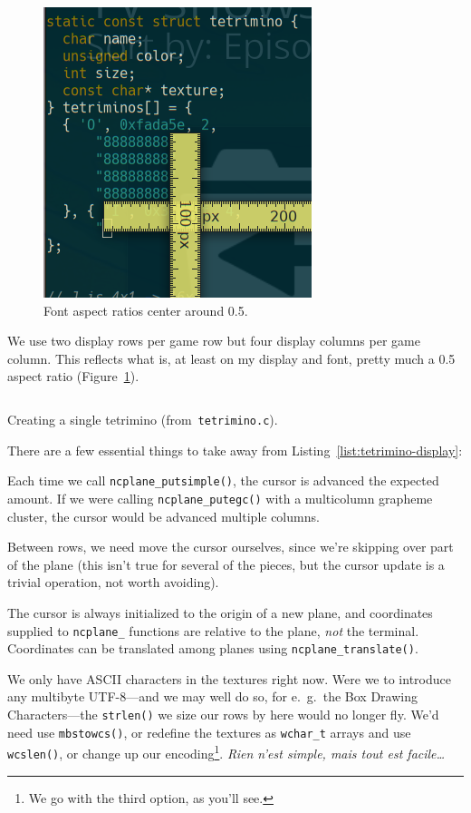 \begin{figure}[!htbp]
\centering \includegraphics[width=.5\linewidth]{media/screenruler.png}
\caption{Font aspect ratios center around 0.5.}
\label{fig:aspectratio}
\end{figure}

We use two display rows per game row but four display columns per game column.
This reflects what is, at least on my display and font, pretty much a 0.5
aspect ratio (Figure~\ref{fig:aspectratio}).

\begin{listing}[!htbp]
\inputminted[]{C}{code/tetrimino-display.h}
\caption{Creating a single tetrimino (from~\texttt{tetrimino.c}).}
\label{list:tetrimino-display}
\end{listing}

There are a few essential things to
take away from Listing~\ref{list:tetrimino-display}:

\begin{denseitemize}
\item{Each time we call \texttt{ncplane\_putsimple()}, the cursor is advanced
      the expected amount. If we were calling \texttt{ncplane\_putegc()} with
      a multicolumn grapheme cluster, the cursor would be advanced multiple
      columns.}
\item{Between rows, we need move the cursor ourselves, since we're skipping over
      part of the plane (this isn't true for several of the pieces, but the
      cursor update is a trivial operation, not worth avoiding).}
\item{The cursor is always initialized to the origin of a new plane, and coordinates
      supplied to \texttt{ncplane\_} functions are relative to the plane,
      \textit{not} the terminal. Coordinates can be translated among planes
      using \texttt{ncplane\_translate()}.}
\item{We only have ASCII characters in the textures right now. Were we to
      introduce any multibyte UTF-8---and we may well do so, for e.\ g.\ the
      Box Drawing Characters---the \texttt{strlen()} we size our rows by here
      would no longer fly. We'd need use \texttt{mbstowcs()}, or redefine the
      textures as \texttt{wchar\_t} arrays and use \texttt{wcslen()},
      or change up our encoding\footnote{We go with the third option, as you'll see.}. \textfrench{\textit{Rien n'est simple, mais tout est facile\ldots}}}
\end{denseitemize}

